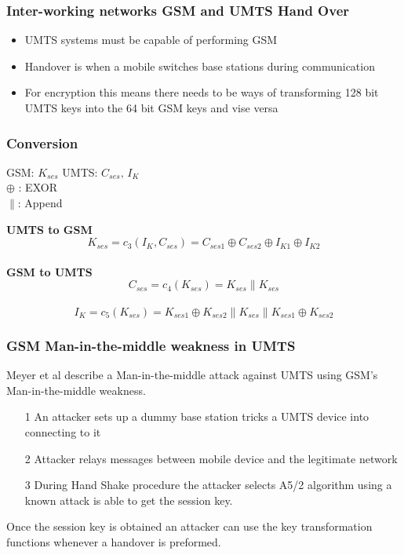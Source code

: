\documentclass{beamer}
\begin{document}
	\begin{frame}
	
	\frametitle{Inter-working networks GSM and UMTS Hand Over}
	\begin{itemize}
		\item UMTS systems must be capable of performing GSM
		\item Handover is when a mobile switches base stations during communication
		\item For encryption this means there needs to be ways of transforming 128 bit UMTS keys into the 64 bit GSM keys and vise versa
	\end{itemize}
	\end{frame}
	\begin{frame}
		\frametitle{Conversion}
			GSM: $K_{ses}$ \longleftrightarrow UMTS: $C_{ses}\text{, } I_{K}$\\
 			$\oplus$ : EXOR\\
			$\|$: Append
 \vspace{.5cm}
	
		\textbf{UMTS to GSM}
		\begin{equation}
			\label{C_3}
			\mathit{K_{ses} = c_{3}(I_{K},C_{ses}) = C_{ses1} \oplus 					C_{ses2}\oplus I_{K1} \oplus I_{K2}}
		\end{equation}\\
		\textbf{GSM to UMTS}
		\begin{equation} 
			\label{C_4}
			\mathit{C_{ses} = c_{4}(K_{ses}) = K_{ses} \| K_{ses}}
		\end{equation}\\

		\begin{equation}
			\label{C_5}
			\mathit{I_{K} = c_{5}(K_{ses}) = K_{ses1}\oplus K_{ses2}\|					K_{ses}\|K_{ses1}\oplus K_{ses2}}
		\end{equation}
	
\end{frame}	
		
\begin{frame}
	\frametitle{GSM Man-in-the-middle weakness in UMTS}
	Meyer et al describe a Man-in-the-middle attack against UMTS using GSM's Man-in-the-middle weakness.
	\begin{itemize}
	\item[1] An attacker sets up a dummy base station tricks a UMTS device into connecting to it
	\item[2] Attacker relays messages between mobile device and the legitimate network
	\item[3] During Hand Shake procedure the attacker selects A5/2 algorithm using a known attack is able to get the session key. 
	\end{itemize}
	\vspace{.25cm}Once the session key is obtained an attacker can use the key transformation functions whenever a handover is preformed.
	
	
\end{frame}
\end{document}
